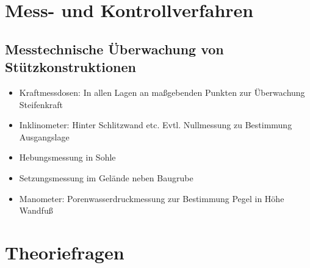 \documentclass[fleqn,twoside]{article}
\begin{document}
\section{Mess- und Kontrollverfahren}


\subsection{Messtechnische Überwachung von Stützkonstruktionen}
\begin{itemize}
    \item Kraftmessdosen: In allen Lagen an maßgebenden Punkten zur Überwachung Steifenkraft
    \item Inklinometer: Hinter Schlitzwand etc. Evtl. Nullmessung zu Bestimmung Ausgangslage
    \item Hebungsmessung in Sohle
    \item Setzungsmessung im Gelände neben Baugrube
    \item Manometer: Porenwasserdruckmessung zur Bestimmung Pegel in Höhe Wandfuß
\end{itemize}


\section{Theoriefragen}
\end{document}
